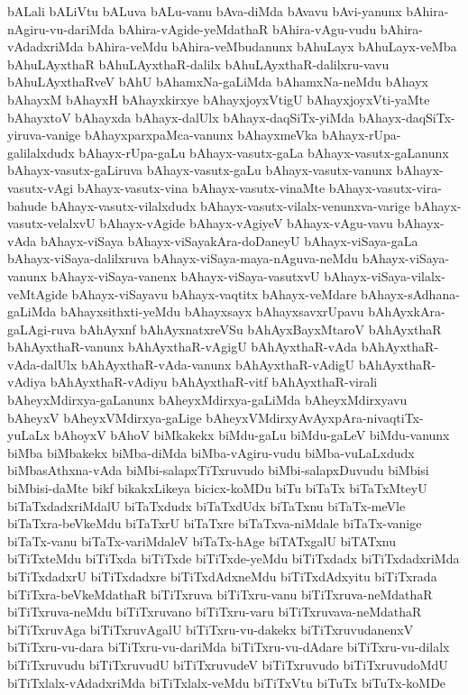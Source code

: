 {bALali
bALiVtu
bALuva
bALu-vanu
bAva-diMda
bAvavu
bAvi-yanunx
bAhira-nAgiru-vu-dariMda
bAhira-vAgide-yeMdathaR
bAhira-vAgu-vudu
bAhira-vAdadxriMda
bAhira-veMdu
bAhira-veMbudanunx
bAhuLayx
bAhuLayx-veMba
bAhuLAyxthaR
bAhuLAyxthaR-dalilx
bAhuLAyxthaR-dalilxru-vavu
bAhuLAyxthaRveV
bAhU
bAhamxNa-gaLiMda
bAhamxNa-neMdu
bAhayx
bAhayxM
bAhayxH
bAhayxkirxye
bAhayxjoyxVtigU
bAhayxjoyxVti-yaMte
bAhayxtoV
bAhayxda
bAhayx-dalUlx
bAhayx-daqSiTx-yiMda
bAhayx-daqSiTx-yiruva-vanige
bAhayxparxpaMca-vanunx
bAhayxmeVka
bAhayx-rUpa-galilalxdudx
bAhayx-rUpa-gaLu
bAhayx-vasutx-gaLa
bAhayx-vasutx-gaLanunx
bAhayx-vasutx-gaLiruva
bAhayx-vasutx-gaLu
bAhayx-vasutx-vanunx
bAhayx-vasutx-vAgi
bAhayx-vasutx-vina
bAhayx-vasutx-vinaMte
bAhayx-vasutx-vira-bahude
bAhayx-vasutx-vilalxdudx
bAhayx-vasutx-vilalx-venunxva-varige
bAhayx-vasutx-velalxvU
bAhayx-vAgide
bAhayx-vAgiyeV
bAhayx-vAgu-vavu
bAhayx-vAda
bAhayx-viSaya
bAhayx-viSayakAra-doDaneyU
bAhayx-viSaya-gaLa
bAhayx-viSaya-dalilxruva
bAhayx-viSaya-maya-nAguva-neMdu
bAhayx-viSaya-vanunx
bAhayx-viSaya-vanenx
bAhayx-viSaya-vasutxvU
bAhayx-viSaya-vilalx-veMtAgide
bAhayx-viSayavu
bAhayx-vaqtitx
bAhayx-veMdare
bAhayx-sAdhana-gaLiMda
bAhayxsithxti-yeMdu
bAhayxsayx
bAhayxsavxrUpavu
bAhAyxkAra-gaLAgi-ruva
bAhAyxnf
bAhAyxnatxreVSu
bAhAyxBayxMtaroV
bAhAyxthaR
bAhAyxthaR-vanunx
bAhAyxthaR-vAgigU
bAhAyxthaR-vAda
bAhAyxthaR-vAda-dalUlx
bAhAyxthaR-vAda-vanunx
bAhAyxthaR-vAdigU
bAhAyxthaR-vAdiya
bAhAyxthaR-vAdiyu
bAhAyxthaR-vitf
bAhAyxthaR-virali
bAheyxMdirxya-gaLanunx
bAheyxMdirxya-gaLiMda
bAheyxMdirxyavu
bAheyxV
bAheyxVMdirxya-gaLige
bAheyxVMdirxyAvAyxpAra-nivaqtiTx-yuLaLx
bAhoyxV
bAhoV
biMkakekx
biMdu-gaLu
biMdu-gaLeV
biMdu-vanunx
biMba
biMbakekx
biMba-diMda
biMba-vAgiru-vudu
biMba-vuLaLxdudx
biMbasAthxna-vAda
biMbi-salapxTiTxruvudo
biMbi-salapxDuvudu
biMbisi
biMbisi-daMte
bikf
bikakxLikeya
bicicx-koMDu
biTu
biTaTx
biTaTxMteyU
biTaTxdadxriMdalU
biTaTxdudx
biTaTxdUdx
biTaTxnu
biTaTx-meVle
biTaTxra-beVkeMdu
biTaTxrU
biTaTxre
biTaTxva-niMdale
biTaTx-vanige
biTaTx-vanu
biTaTx-variMdaleV
biTaTx-hAge
biTATxgalU
biTATxnu
biTiTxteMdu
biTiTxda
biTiTxde
biTiTxde-yeMdu
biTiTxdadx
biTiTxdadxriMda
biTiTxdadxrU
biTiTxdadxre
biTiTxdAdxneMdu
biTiTxdAdxyitu
biTiTxrada
biTiTxra-beVkeMdathaR
biTiTxruva
biTiTxru-vanu
biTiTxruva-neMdathaR
biTiTxruva-neMdu
biTiTxruvano
biTiTxru-varu
biTiTxruvava-neMdathaR
biTiTxruvAga
biTiTxruvAgalU
biTiTxru-vu-dakekx
biTiTxruvudanenxV
biTiTxru-vu-dara
biTiTxru-vu-dariMda
biTiTxru-vu-dAdare
biTiTxru-vu-dilalx
biTiTxruvudu
biTiTxruvudU
biTiTxruvudeV
biTiTxruvudo
biTiTxruvudoMdU
biTiTxlalx-vAdadxriMda
biTiTxlalx-veMdu
biTiTxVtu
biTuTx
biTuTx-koMDe
}
